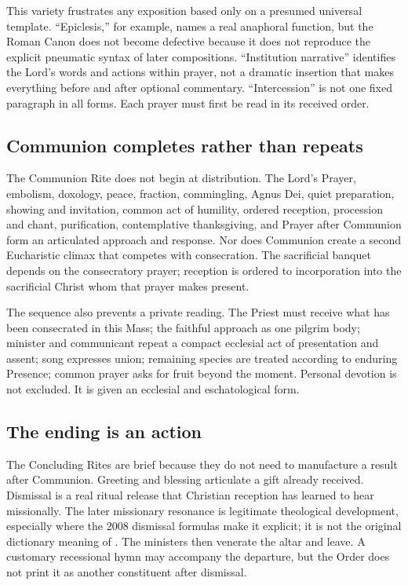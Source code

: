 This variety frustrates any exposition based only on a presumed universal template. ``Epiclesis,'' for example, names a real anaphoral function, but the Roman Canon does not become defective because it does not reproduce the explicit pneumatic syntax of later compositions. ``Institution narrative'' identifies the Lord's words and actions within prayer, not a dramatic insertion that makes everything before and after optional commentary. ``Intercession'' is not one fixed paragraph in all forms. Each prayer must first be read in its received order.

\subsection{Communion completes rather than repeats}

The Communion Rite does not begin at distribution. The Lord's Prayer, embolism, doxology, peace, fraction, commingling, Agnus Dei, quiet preparation, showing and invitation, common act of humility, ordered reception, procession and chant, purification, contemplative thanksgiving, and Prayer after Communion form an articulated approach and response. Nor does Communion create a second Eucharistic climax that competes with consecration. The sacrificial banquet depends on the consecratory prayer; reception is ordered to incorporation into the sacrificial Christ whom that prayer makes present.

The sequence also prevents a private reading. The Priest must receive what has been consecrated in this Mass; the faithful approach as one pilgrim body; minister and communicant repeat a compact ecclesial act of presentation and assent; song expresses union; remaining species are treated according to enduring Presence; common prayer asks for fruit beyond the moment. Personal devotion is not excluded. It is given an ecclesial and eschatological form.

\subsection{The ending is an action}

The Concluding Rites are brief because they do not need to manufacture a result after Communion. Greeting and blessing articulate a gift already received. Dismissal is a real ritual release that Christian reception has learned to hear missionally. The later missionary resonance is legitimate theological development, especially where the 2008 dismissal formulas make it explicit; it is not the original dictionary meaning of . The ministers then venerate the altar and leave. A customary recessional hymn may accompany the departure, but the Order does not print it as another constituent after dismissal.

